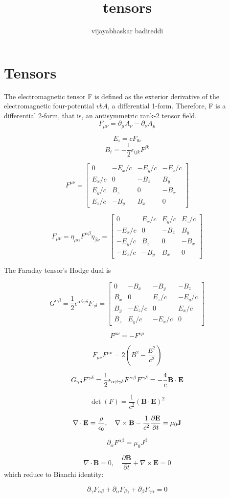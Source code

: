 \documentclass[12pt]{article}
\title{tensors}
\author{vijayabhaskar badireddi}
\date{}
\begin{document}
\section*{Tensors}
The electromagnetic tensor F is defined as the exterior derivative of the electromagnetic four-potential $vb{A}$, a differential 1-form.
Therefore, F is a differential 2-form, that is, an antisymmetric rank-2 tensor field.
\[F_{\mu\nu} = \partial_\mu A_\nu - \partial_\nu A_\mu\]

\[E_{i}=cF_{0i}\]
\[B_{i}=-\frac{1}{2}\epsilon_{ijk}F^{jk}\]

\[ F^{\mu \nu }={\begin{bmatrix}0&-E_{x}/c&-E_{y}/c&-E_{z}/c\\E_{x}/c&0&-B_{z}&B_{y}\\E_{y}/c&B_{z}&0&-B_{x}\\E_{z}/c&-B_{y}&B_{x}&0\end{bmatrix}}\]

\[ F_{\mu \nu }=\eta _{\mu \alpha }F^{\alpha \beta }\eta _{\beta \nu }={\begin{bmatrix}0&E_{x}/c&E_{y}/c&E_{z}/c\\-E_{x}/c&0&-B_{z}&B_{y}\\-E_{y}/c&B_{z}&0&-B_{x}\\-E_{z}/c&-B_{y}&B_{x}&0\end{bmatrix}}\]

The Faraday tensor's Hodge dual is

\[ {G^{\alpha \beta }={\frac {1}{2}}\epsilon ^{\alpha \beta \gamma \delta }F_{\gamma \delta }={\begin{bmatrix}0&-B_{x}&-B_{y}&-B_{z}\\B_{x}&0&E_{z}/c&-E_{y}/c\\B_{y}&-E_{z}/c&0&E_{x}/c\\B_{z}&E_{y}/c&-E_{x}/c&0\end{bmatrix}}}\]

\[\tag{anti symmetry} F^{\mu \nu }=-F^{\nu \mu }\]

\[ F_{\mu \nu }F^{\mu \nu }=2\left(B^{2}-{\frac {E^{2}}{c^{2}}}\right)\]

\[G_{\gamma \delta }F^{\gamma \delta }=\frac {1}{2}\epsilon _{\alpha \beta \gamma \delta }F^{\alpha \beta }F^{\gamma \delta }=-\frac {4}{c}\vb{B}\cdot \vb{E}\]

\[\det \left(F\right)={\frac {1}{c^{2}}}\left({\mathbf {B}}\cdot {\mathbf {E}}\right)^{2}\]

\[ \nabla \cdot \mathbf{E} = \frac{\rho}{\epsilon_0},\quad \nabla \times \mathbf{B} - \frac{1}{c^2} \frac{ \partial \mathbf{E}}{\partial t} = \mu_0 \vb{J}
\]

\[\partial_{\alpha} F^{\alpha\beta} = \mu_0 J^{\beta}\]

\[ \nabla \cdot \mathbf{B} = 0,\quad \frac{ \partial \mathbf{B}}{ \partial t } + \nabla \times \mathbf{E} = 0 \]
which reduce to Bianchi identity:

\[\partial_\gamma F_{ \alpha \beta } + \partial_\alpha F_{ \beta \gamma } + \partial_\beta F_{ \gamma \alpha } = 0 \]
\end{document}
